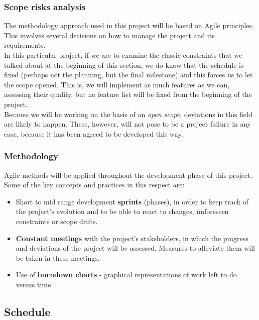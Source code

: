 \subsubsection{Scope risks analysis}

The methodology approach used in this project will be based on Agile principles. This involves several decisions on how to manage the project and its requirements.\\

In this particular project, if we are to examine the classic constraints that we talked about at the beginning of this section, we do know that the schedule is fixed (perhaps not the planning, but the final milestone) and this forces us to let the scope opened. This is, we will implement as much features as we can, assessing their quality, but no feature list will be fixed from the beginning of the project.\\

Because we will be working on the basis of an \textit{open scope}, deviations in this field are likely to happen. These, however, will not pose to be a project failure in any case, because it has been agreed to be developed this way.

\subsubsection{Methodology}

Agile methods will be applied throughout the development phase of this project. Some of the key concepts and practices in this respect are:

\begin{itemize}
	\item Short to mid range development \textbf{sprints} (phases), in order to keep track of the project’s evolution and to be able to react to changes, unforeseen constraints or scope drifts.
	\item \textbf{Constant meetings} with the project’s stakeholders, in which the progress and deviations of the project will be assessed. Measures to alleviate them will be taken in these meetings.
	\item Use of \textbf{burndown charts} - graphical representations of work left to do versus time.
\end{itemize}


\subsection{Schedule}
